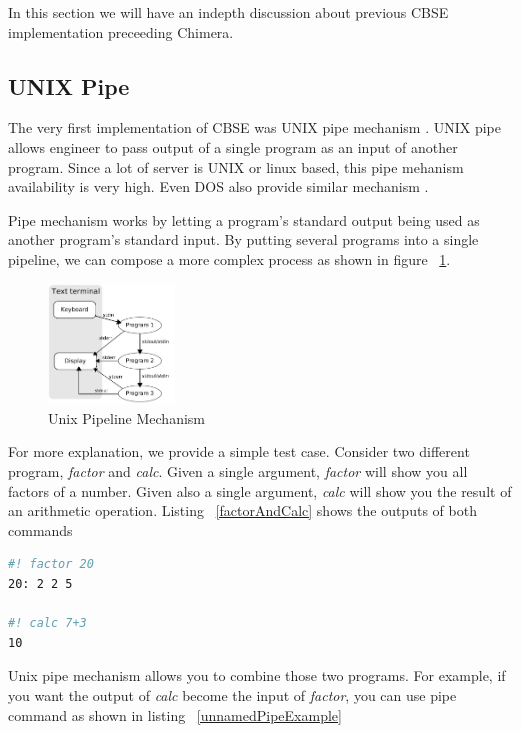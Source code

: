 \documentclass[conference]{IEEEtran}
\begin{document}
In this section we will have an indepth discussion about previous CBSE implementation 
preceeding Chimera.


\subsection{UNIX Pipe}

The very first implementation of CBSE was UNIX pipe mechanism \cite{mcilroy1968mass}. 
UNIX pipe allows engineer to pass output of a single program as an input of 
another program. Since a lot of server is UNIX or linux based, this pipe 
mehanism availability is very high. Even DOS also provide similar mechanism 
\cite{dos7command}.

Pipe mechanism works by letting a program's standard output being used as another
program's standard input. By putting several programs into a single pipeline, we can
compose a more complex process as shown in figure ~\ref{fig:unixPipe}.

\begin{figure}
	\centering
	\includegraphics[width=0.3\textwidth]
		{images/Pipeline.jpg}
	\caption{Unix Pipeline Mechanism}
	\label{fig:unixPipe}
\end{figure}

For more explanation, we provide a simple test case. Consider two different program,
{\it factor} and {\it calc}. Given a single argument, {\it factor} will show you all 
factors of a number. Given also a single argument, {\it calc} will show you the result 
of an arithmetic operation. Listing ~\ref{factorAndCalc} shows the outputs of both commands

\begin{lstlisting}[caption=Usage of factor and calc, label=factorAndCalc, language=bash, basicstyle=\small, breaklines=true]
#! factor 20
20: 2 2 5

#! calc 7+3 
10
\end{lstlisting}

Unix pipe mechanism allows you to combine those two programs. For example, if you
want the output of {\it calc} become the input of {\it factor}, you can use pipe
command as shown in listing ~\ref{unnamedPipeExample}
\end{document}
